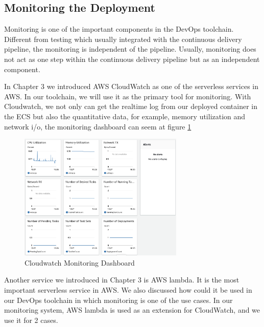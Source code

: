 \subsection{Monitoring the Deployment}
Monitoring is one of the important components in the DevOps toolchain. Different from testing which usually integrated with the continuous delivery pipeline, the monitoring is independent of the pipeline. Usually, monitoring does not act as one step within the continuous delivery pipeline but as an independent component.
\par
In Chapter 3 we introduced AWS CloudWatch as one of the serverless services in AWS. In our toolchain, we will use it as the primary tool for monitoring. With Cloudwatch, we not only can get the realtime log from our deployed container in the ECS but also the quantitative data, for example, memory utilization and network i/o, the monitoring dashboard can seem at figure \ref{fig:monitoring}
\begin{figure}[h]
 \centering
 \includegraphics[width=0.70\textwidth]{pics/monitoring.png}
 \caption{Cloudwatch Monitoring Dashboard}
 \label{fig:monitoring}
\end{figure}
Another service we introduced in Chapter 3 is AWS lambda. It is the most important serverless service in AWS. We also discussed how could it be used in our DevOps toolchain in which monitoring is one of the use cases. In our monitoring system, AWS lambda is used as an extension for CloudWatch, and we use it for 2 cases.
